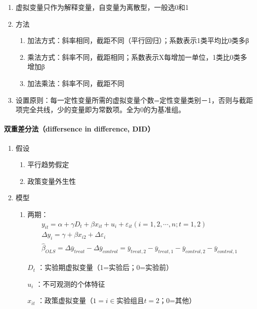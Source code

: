 \documentclass[12pt]{book}
\begin{document}
\begin{enumerate}[1.]
    \item 虚拟变量只作为解释变量，自变量为离散型，一般选0和1
    \item 方法
    \begin{enumerate}[(1)]
        \item 加法方式：斜率相同，截距不同（平行回归）；系数表示1类平均比0类多β
        \item 乘法方式：斜率不同，截距相同；系数表示X每增加一单位，1类比0类多增加β
        \item 加法乘法：斜率不同，截距不同
    \end{enumerate}
    \item 设置原则：每一定性变量所需的虚拟变量个数=定性变量类别－1，否则与截距项完全共线，少的变量即为常数项。全为0的为基准组。
\end{enumerate}


\paragraph{双重差分法（differsence in difference, DID）}

\begin{enumerate}[1.]
    \item 假设
          \begin{enumerate}[(1)]
              \item 平行趋势假定
              \item 政策变量外生性
          \end{enumerate}
    \item 模型
          \begin{enumerate}[(1)]
              \item 两期：
                    \begin{gather*}
                        y_{it}=\alpha+\gamma D_t+\beta x_{it}+u_i+\varepsilon_{it} (i=1,2,\cdots,n;t=1,2) \\ \Delta y_i = \gamma+\beta x_{i2}+\Delta \varepsilon_i \\ {\hat{\beta}}_{OLS}=\Delta{\bar{y}}_{treat}-\Delta \bar{y}_{control} = \bar{y}_{treat,2}-\bar{y}_{treat,1}- \bar{y}_{control,2}-\bar{y}_{control,1}\
                    \end{gather*}
                    \par $D_t$ ：实验期虚拟变量（1=实验后；0=实验前）
                    \par $u_i$ ：不可观测的个体特征
                    \par $x_{it}$ ：政策虚拟变量（$1=i\in $实验组且$t=2$；0=其他）
          \end{enumerate}
\end{enumerate}
\end{document}
